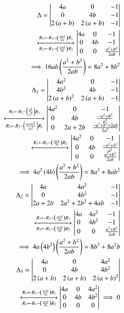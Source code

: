 \documentclass[journal,12pt,twocolumn]{IEEEtran}
\begin{document}
\begin{align}
    \Delta = \begin{vmatrix}4a&0&-1\\0&4b&-1\\2\left(a+b\right)&2\left(a+b\right)&-1\end{vmatrix}\\
    \xleftrightarrow[R_3\leftarrow R_3-\left(\frac{a+b}{2b}\right)R_2]{R_3\leftarrow R_3-\ensuremath{\left(\frac{a+b}{2 a}\right)}R_1}
    \begin{vmatrix}4a & 0 & -1 \\0 & 4b & -1 \\0 & 0 & \frac{a^2+b^2}{2ab}\end{vmatrix}\\
    \implies 16ab\left(\frac{a^2+b^2}{2ab}\right) = 8a^2+8b^2\label{eq:1} \\
\Delta_{1} =\begin{vmatrix}4a^2 & 0 & -1 \\4b^2 & 4b & -1 \\ 2\left(a+b\right)^2 & 2\left(a+b\right) & -1\end{vmatrix}\\
    \xleftrightarrow[R_3\leftarrow R_3-\left(\frac{\left(a+b\right)^2}{2a^2}\right)R_1]{R_2\leftarrow R_2-\ensuremath{\left(\frac{b^2}{a^2}\right)}R_1}
    \begin{vmatrix}4a^2 & 0 & -1 \\0 & 4b & \frac{-a^2+b^2}{a^2} \\0 & 2a+2b &\frac{-a^2+b^2+2ab}{2a^2}\end{vmatrix}\\
    \xleftrightarrow[]{R_3\leftarrow R_3-\ensuremath{\left(\frac{a+b}{2b}\right)}R_2}
    \begin{vmatrix}4a^2 & 0 & -1 \\0 & 4b & \frac{-a^2+b^2}{a^2} \\0 & 0 & \frac{a^2+b^2}{2ab}\end{vmatrix}\\
\implies 4a^2\left(4b\right)\left(\frac{a^2+b^2}{2ab}\right)= 8a^3+8ab^2\label{eq:2}\\
\Delta_{2} =
    \begin{vmatrix}4a & 4a^2 & -1 \\0 & 4b^2 & -1 \\2a+2b & 2a^2+2b^2+4ab & -1\end{vmatrix}\\
\xleftrightarrow[R_3\leftarrow R_3-\left(\frac{a+b}{2b}\right)R_2]{R_3\leftarrow R_3-\ensuremath{\left(\frac{a+b}{2a}\right)}R_1}
\begin{vmatrix}4a & 4a^2 & -1 \\0 & 4b^2 & -1 \\0 & 0 & \frac{a^2+b^2}{2ab}\end{vmatrix}\\
\implies 4a\left(4b^2\right)\left(\frac{a^2+b^2}{2ab}\right) = 8b^3+8a^2b \label{eq:3}\\
\Delta_{3} = 
    \begin{vmatrix}4a & 0 & 4a^2 \\0 & 4b & 4b^2 \\2\left(a+b\right) & 2\left(a+b\right) & 2\left(a+b\right)^2\end{vmatrix}\\
    \xleftrightarrow[R_3\leftarrow R_3-\left(\frac{a+b}{2b}\right)R_2]{R_3\leftarrow R_3-\ensuremath{\left(\frac{a+b}{2a}\right)}R_1}
    \begin{vmatrix}4a & 0 & 4a^2 \\0 & 4b & 4b^2 \\0 & 0 & 0\end{vmatrix} \implies 0 \label{eq:4} 
\end{align}
\end{document}
